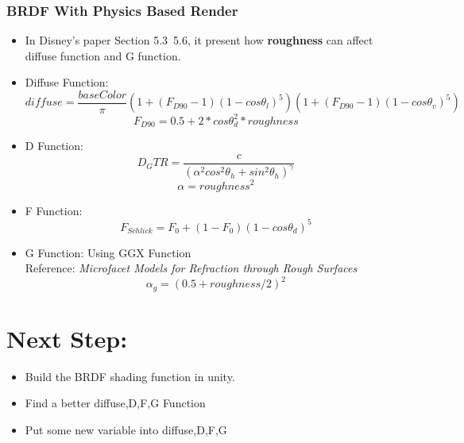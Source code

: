 \documentclass[cyan,normal,en]{elegantnote}
\begin{document}
\subsubsection{BRDF With Physics Based Render}
\begin{itemize}
	\item In Disney's paper Section 5.3~5.6, it present how \textbf{roughness} can affect diffuse function and G function.
	\item Diffuse Function:
	$$diffuse=\frac{baseColor}{\pi}(1+(F_{D90}-1)(1-cos\theta_l)^5)(1+(F_{D90}-1)(1-cos\theta_v)^5)$$
	$$F_{D90}=0.5+2*cos\theta^2_d*roughness$$
	\item D Function:
	$$D_GTR=\frac{c}{(\alpha^2cos^2\theta_h +sin^2\theta_h)^\gamma}$$
	$$\alpha=roughness^2$$
	\item F Function:
	$$F_{Schlick}=F_0 + (1-F_0)(1-cos\theta_d)^5$$
	\item G Function: Using GGX Function\\
	Reference: \textit{Microfacet Models for Refraction through Rough Surfaces }
	$$\alpha_g=(0.5+roughness/2)^2$$
\end{itemize}
\section{Next Step:}
\begin{itemize}
	\item Build the BRDF shading function in unity.
	\item Find a better diffuse,D,F,G Function
	\item Put some new variable into diffuse,D,F,G
\end{itemize}
\newpage
\end{document}
